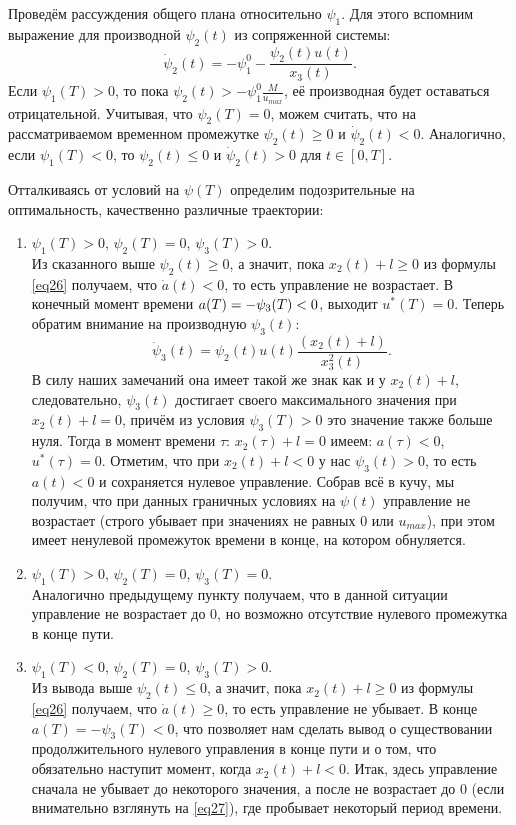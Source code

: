 \documentclass[a4paper,12pt]{article}
\newcommand{\hm}[1]{#1\nobreak\discretionary{}{\hbox{\ensuremath{#1}}}{}}
\begin{document}
\begin{itemize}
Проведём рассуждения общего плана относительно $\psi_1$. Для этого вспомним выражение для производной $\psi_2(t)$ из сопряженной системы:
\[ \dot{\psi}_2(t) = - \psi_1^0 - \dfrac{\psi_{2}(t)u(t)}{x_{3}(t)}. \]
Если $\psi_1(T) > 0$, то пока $\psi_2(t) > -\psi_1^0 \frac{M}{u_{max}}$, её производная будет оставаться отрицательной. Учитывая, что $\psi_2(T) = 0$, можем считать, что на рассматриваемом временном промежутке $\psi_2(t) \geqslant 0$ и $\dot{\psi}_2(t) < 0$. Аналогично, если $\psi_1(T) < 0$, то $\psi_2(t) \leqslant 0$ и $\dot{\psi}_2(t) > 0$ для $t \in [0, T]$.

Отталкиваясь от условий на $\psi(T)$ определим подозрительные на оптимальность, качественно различные траектории: 
\begin{enumerate}
\item $\psi_1(T) > 0$, $\psi_2(T) = 0$, $\psi_3(T) > 0$. \\
Из сказанного выше $\psi_2(t) \geqslant 0$, а значит, пока $x_2(t) + l \geqslant 0$ из формулы \eqref{eq26} получаем, что $\dot{a}(t) < 0$, то есть управление не возрастает. В конечный момент времени $a(T) =  \hm -\psi_3(T) < 0$, выходит $u^*(T) = 0$. Теперь обратим внимание на производную $\psi_3(t)$:
\[ \dot{\psi}_3(t) = \psi_2(t)u(t) \dfrac{(x_2(t) + l)}{x_3^2(t)}. \]
В силу наших замечаний она имеет такой же знак как и у $x_2(t) + l$, следовательно, $\psi_3(t)$ достигает своего максимального значения при $x_2(t) + l = 0$, причём из условия $\psi_3(T) > 0$ это значение также больше нуля. Тогда в момент времени $\tau$: $x_2(\tau) + l = 0$ имеем: $a(\tau) < 0$, $u^*(\tau) = 0$. Отметим, что при $x_2(t) + l < 0$ у нас $\psi_3(t) > 0$, то есть $a(t) < 0$ и сохраняется нулевое управление. Собрав всё в кучу, мы получим, что при данных граничных условиях на $\psi(t)$ управление не возрастает (строго убывает при значениях не равных 0 или $u_{max}$), при этом имеет ненулевой промежуток времени в конце, на котором обнуляется.

\item $\psi_1(T) > 0$, $\psi_2(T) = 0$, $\psi_3(T) = 0$. \\
Аналогично предыдущему пункту получаем, что в данной ситуации управление не возрастает до 0, но возможно отсутствие нулевого промежутка в конце пути.

\item $\psi_1(T) < 0$, $\psi_2(T) = 0$, $\psi_3(T) > 0$. \\
Из вывода выше $\psi_2(t) \leqslant 0$, а значит, пока $x_2(t) + l \geqslant 0$ из формулы \eqref{eq26} получаем, что $\dot{a}(t) \geqslant 0$, то есть управление не убывает. В конце $a(T) = -\psi_3(T) < 0$, что позволяет нам сделать вывод о существовании продолжительного нулевого управления в конце пути и о том, что обязательно наступит момент, когда $x_2(t) + l < 0$. Итак, здесь управление сначала не убывает до некоторого значения, а после не возрастает до 0 (если внимательно взглянуть на \eqref{eq27}), где пробывает некоторый период времени.


\end{enumerate}
\end{itemize}
\end{document}
